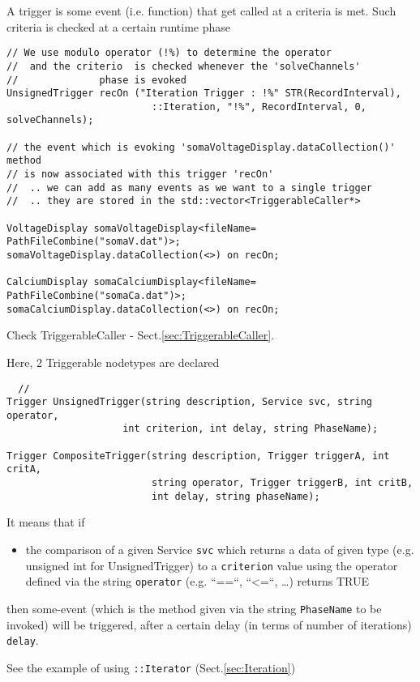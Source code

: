 A trigger is some event (i.e. function) that get called
at a criteria is met. Such criteria is checked at a certain runtime phase
\begin{verbatim}
// We use modulo operator (!%) to determine the operator
//  and the criterio  is checked whenever the 'solveChannels' 
//              phase is evoked
UnsignedTrigger recOn ("Iteration Trigger : !%" STR(RecordInterval),
                         ::Iteration, "!%", RecordInterval, 0, solveChannels);
                         
// the event which is evoking 'somaVoltageDisplay.dataCollection()' method
// is now associated with this trigger 'recOn'
//  .. we can add as many events as we want to a single trigger
//  .. they are stored in the std::vector<TriggerableCaller*>
                         
VoltageDisplay somaVoltageDisplay<fileName= PathFileCombine("somaV.dat")>;
somaVoltageDisplay.dataCollection(<>) on recOn;  

CalciumDisplay somaCalciumDisplay<fileName= PathFileCombine("somaCa.dat")>;
somaCalciumDisplay.dataCollection(<>) on recOn;

\end{verbatim}
Check TriggerableCaller - Sect.\ref{sec:TriggerableCaller}.

Here, 2 Triggerable nodetypes are declared
\begin{verbatim}
  // 
Trigger UnsignedTrigger(string description, Service svc, string operator, 
                    int criterion, int delay, string PhaseName);

Trigger CompositeTrigger(string description, Trigger triggerA, int critA, 
                         string operator, Trigger triggerB, int critB, 
                         int delay, string phaseName);

\end{verbatim}
It means that if 
\begin{itemize}
  \item the comparison of a given Service
\verb!svc! which returns a data of given type (e.g. unsigned int for UnsignedTrigger)
to a \verb!criterion! value using the operator defined via the string
\verb!operator! (e.g. ``==``, ``<=``, \ldots) returns TRUE
\end{itemize}
then some-event (which is the method given via the string \verb!PhaseName! to be
invoked) will be triggered, after a certain delay (in terms of number of
iterations) \verb!delay!.

See the example of using \verb!::Iterator! (Sect.\ref{sec:Iteration})


